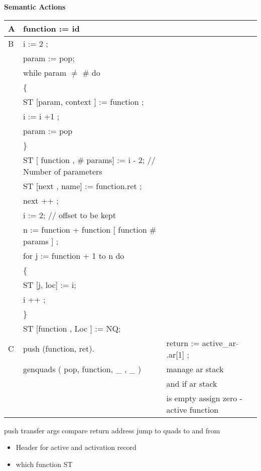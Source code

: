 \documentclass[11pt]{article}
\begin{document}
\textbf{Semantic Actions }
 \begin{table}[htdp]
\begin{center}
\begin{tabular}{l|ll}
A & function := id \\
\hline
B	&	i := 2 ; \\
	&	param := pop; \\
	&	while param $\neq$ \# do \\
	&	\{	\\
	&	\hspace{0.5cm}	ST [param, context ] := function ; \\
	&	\hspace{0.5cm}	i := i +1 ; \\
	&	\hspace{0.5cm}	param := pop \\
	& 	\}	\\
	&	ST [ function , \# params] := i - 2;  // Number of parameters  \\
	& 	ST [next , name] := function.ret ; \\
	&	next ++ ; 	\\
	&	i := 2;    // offset to be kept   \\
	&	n := function + function [ function \# params ] ; \\
	&	for j := function + 1 to n do \\
	&	\{ \\
	&	\hspace{0.5cm}	ST [j, loc] := i; \\
	&	\hspace{0.5cm}	i ++ ; \\
	&	\} \\
	&	ST [function , Loc ] := NQ; \\
	\hline
C	& 	push (function, ret).
	&	return := active\_ar $\hat{ }$ .ar[1] ; \\
	&	genquads ( pop, function, \_ , \_ ) & manage ar stack \\
	&								& and if ar stack \\
	&								& is empty assign zero  - active function \\
\end{tabular}
\end{center}
\label{default}
\end{table}%


push
transfer args
compare return address
jump to quads to and from 



\begin{itemize}
\item Header for active  and activation record
\item which function ST
\end{itemize}
\end{document}
